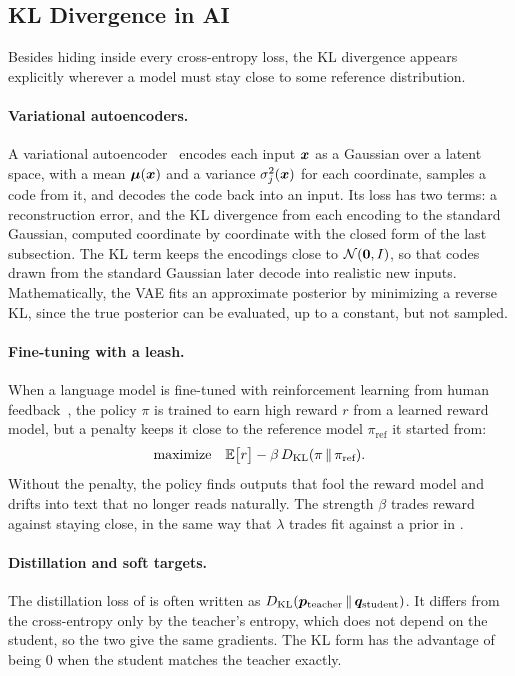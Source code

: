 \subsection{KL Divergence in AI}
\label{sec:ch07-kl-ai}

Besides hiding inside every cross-entropy loss, the KL divergence
appears explicitly wherever a model must stay close to some reference
distribution.

\paragraph{Variational autoencoders.}
A variational autoencoder~\cite{kingma2014vae} encodes each input
$\bm{x}$ as a Gaussian over a latent space, with a mean
$\bm{\mu}(\bm{x})$ and a variance $\sigma_j^2(\bm{x})$ for each
coordinate, samples a code from it, and decodes the code back into an
input. Its loss
has two terms: a reconstruction error, and the KL divergence from each
encoding to the standard Gaussian, computed coordinate by coordinate with
the closed form of the last subsection. The KL term keeps the encodings
close to $\mathcal{N}(\bm{0}, I)$, so that codes drawn from the
standard Gaussian later decode into realistic new inputs. Mathematically,
the VAE fits an approximate posterior by minimizing a reverse KL, since
the true posterior can be evaluated, up to a constant, but not sampled.

\paragraph{Fine-tuning with a leash.}
When a language model is fine-tuned with reinforcement learning from
human feedback~\cite{ouyang2022instructgpt}, the policy $\pi$ is
trained to earn high reward $r$ from a learned reward model, but a
penalty keeps it close to the reference model $\pi_{\text{ref}}$ it
started from:
\[
  \text{maximize}\quad
  \mathbb{E}\bigl[r\bigr] - \beta\, D_{\mathrm{KL}}(\pi \,\|\, \pi_{\text{ref}}) .
\]
Without the penalty, the policy finds outputs that fool the reward model
and drifts into text that no longer reads naturally. The strength $\beta$
trades reward against staying close, in the same way that $\lambda$
trades fit against a prior in .

\paragraph{Distillation and soft targets.}
The distillation loss of  is often written
as $D_{\mathrm{KL}}(\bm{p}_{\text{teacher}} \,\|\,
\bm{q}_{\text{student}})$. It differs from the cross-entropy only by the
teacher's entropy, which does not depend on the student, so the two give
the same gradients. The KL form has the advantage of being $0$ when the
student matches the teacher exactly.

